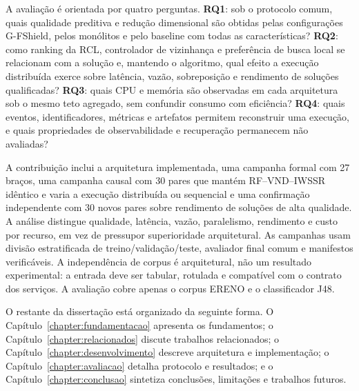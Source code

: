 A avaliação é orientada por quatro perguntas. \textbf{RQ1}: sob o protocolo comum, quais qualidade preditiva e redução dimensional são obtidas pelas configurações G-FShield, pelos monólitos e pelo baseline com todas as características? \textbf{RQ2}: como ranking da RCL, controlador de vizinhança e preferência de busca local se relacionam com a solução e, mantendo o algoritmo, qual efeito a execução distribuída exerce sobre latência, vazão, sobreposição e rendimento de soluções qualificadas? \textbf{RQ3}: quais CPU e memória são observadas em cada arquitetura sob o mesmo teto agregado, sem confundir consumo com eficiência? \textbf{RQ4}: quais eventos, identificadores, métricas e artefatos permitem reconstruir uma execução, e quais propriedades de observabilidade e recuperação permanecem não avaliadas?

A contribuição inclui a arquitetura implementada, uma campanha formal com 27 braços, uma campanha causal com 30 pares que mantém RF--VND--IWSSR idêntico e varia a execução distribuída ou sequencial e uma confirmação independente com 30 novos pares sobre rendimento de soluções de alta qualidade. A análise distingue qualidade, latência, vazão, paralelismo, rendimento e custo por recurso, em vez de pressupor superioridade arquitetural. As campanhas usam divisão estratificada de treino/validação/teste, avaliador final comum e manifestos verificáveis. A independência de corpus é arquitetural, não um resultado experimental: a entrada deve ser tabular, rotulada e compatível com o contrato dos serviços. A avaliação cobre apenas o corpus ERENO e o classificador J48.

O restante da dissertação está organizado da seguinte forma. O Capítulo~\ref{chapter:fundamentacao} apresenta os fundamentos; o Capítulo~\ref{chapter:relacionados} discute trabalhos relacionados; o Capítulo~\ref{chapter:desenvolvimento} descreve arquitetura e implementação; o Capítulo~\ref{chapter:avaliacao} detalha protocolo e resultados; e o Capítulo~\ref{chapter:conclusao} sintetiza conclusões, limitações e trabalhos futuros.
